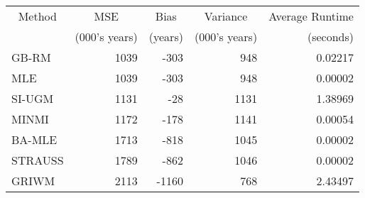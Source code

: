 
\begin{tabular}{lrrrr}
\toprule
\multicolumn{1}{c}{Method} & \multicolumn{1}{c}{MSE} & \multicolumn{1}{c}{Bias} & \multicolumn{1}{c}{Variance} & \multicolumn{1}{c}{Average Runtime} \\
\cmidrule(l{3pt}r{3pt}){1-1} \cmidrule(l{3pt}r{3pt}){2-2} \cmidrule(l{3pt}r{3pt}){3-3} \cmidrule(l{3pt}r{3pt}){4-4} \cmidrule(l{3pt}r{3pt}){5-5}
 & (000's years) & (years) & (000's years) & (seconds)\\
\midrule
GB-RM & 1039 & -303 & 948 & 0.02217\\
MLE & 1039 & -303 & 948 & 0.00002\\
SI-UGM & 1131 & -28 & 1131 & 1.38969\\
MINMI & 1172 & -178 & 1141 & 0.00054\\
BA-MLE & 1713 & -818 & 1045 & 0.00002\\
\addlinespace
STRAUSS & 1789 & -862 & 1046 & 0.00002\\
GRIWM & 2113 & -1160 & 768 & 2.43497\\
\bottomrule
\end{tabular}
